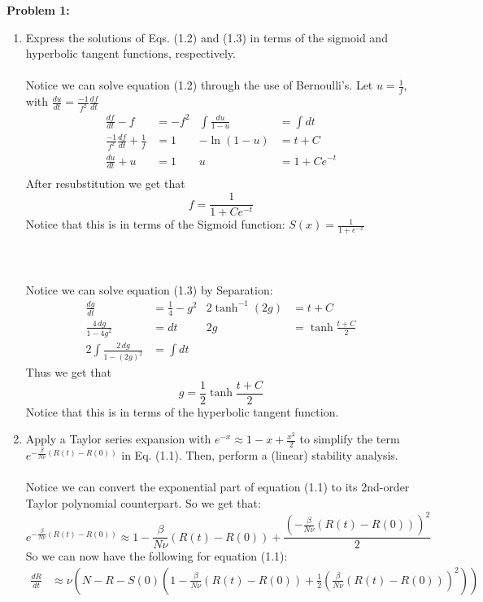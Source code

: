 \documentclass[11pt]{article}
\newcommand{\bmath}[1]{\boldmath#1\unboldmath}
\newenvironment{problem}[1]{\textbf{Problem #1: }}{\newpage}
\begin{document}
\begin{problem}{1}
\begin{enumerate}[label = (\alph*)]
			\item Express the solutions of Eqs. (1.2) and (1.3) in terms of the sigmoid and hyperbolic tangent functions, respectively.
			\\ \\
			Notice we can solve equation (1.2)  through the use of Bernoulli's.  Let $u = \frac{1}{f}$, with $\frac{du}{dt} = \frac{-1}{f^2} \frac{df}{dt}$
			\begin{align*}
				\frac{df}{dt} - f &= -f^2 & \int \frac{du}{1 - u} &= \int dt \\
				\frac{-1}{f^2} \frac{df}{dt} + \frac{1}{f} &= 1 & -\ln(1-u) &= t + C \\
				\frac{du}{dt} + u &= 1 & u &= 1 + Ce^{-t} \\
			\end{align*}
			After resubstitution we get that \bmath{\[f = \frac{1}{1 + Ce^{-t}}\]} Notice that this is in terms of the Sigmoid function: $S(x) = \frac{1}{1 + e^{-x}}$
			\\ \\ \\ \\
			Notice we can solve equation (1.3) by Separation:
			\begin{align*}
				\frac{dg}{dt} &= \frac{1}{4} - g^2 & 2 \tanh^{-1} (2g) &= t + C \\
				\frac{4\,dg}{1 - 4g^2} &= dt & 2g &= \tanh \frac{t + C}{2} \\
				2 \int \frac{2 \, dg}{1 - (2g)^2} &= \int dt 
			\end{align*}
			Thus we get that
			\bmath{\[g = \frac{1}{2}\tanh \frac{t + C}{2}\]}
			Notice that this is in terms of the hyperbolic tangent function.
			\newpage
			\item  Apply a Taylor series expansion with $e^{-x} \approx 1 - x + \frac{x^2}{2}$ to simplify the term $e^{-\frac{\beta}{N \nu}(R(t) - R(0))}$ in Eq. (1.1). Then, perform a (linear) stability analysis.
			\\ \\
			Notice we can convert the exponential part of equation (1.1) to its 2nd-order Taylor polynomial counterpart.  So we get that:
			\[e^{-\frac{\beta}{N \nu}(R(t) - R(0))} \approx 1 - \frac{\beta}{N \nu}(R(t) - R(0)) + \frac{\left(-\frac{\beta}{N \nu}(R(t) - R(0))\right)^2}{2}\]
			So we can now have the following for equation (1.1):
			\begin{align*}
			\frac{dR}{dt} &\approx  \nu \left(N - R - S(0) \left( 1 - \frac{\beta}{N \nu}(R(t) - R(0)) + \frac{1}{2}\left(\frac{\beta}{N \nu}(R(t) - R(0))\right)^2\right) \right) \\

\end{align*}
\end{enumerate}
\end{problem}
\end{document}
